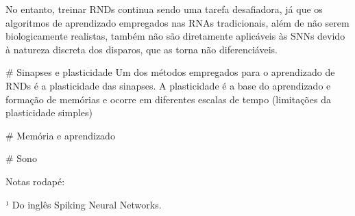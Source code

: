 No entanto, treinar RNDs continua sendo uma tarefa desafiadora, já que os algoritmos de aprendizado empregados nas RNAs tradicionais, além de não serem biologicamente realistas,
também não são diretamente aplicáveis às SNNs devido à natureza discreta dos disparos, que as torna não diferenciáveis.

# Sinapses e plasticidade Um dos métodos empregados para o aprendizado de RNDs é a plasticidade das sinapses. A plasticidade é a base do aprendizado e formação de memórias e ocorre
em diferentes escalas de tempo (limitações da plasticidade simples)

# Memória e aprendizado


# Sono

Notas rodapé:

¹ Do inglês Spiking Neural Networks.

